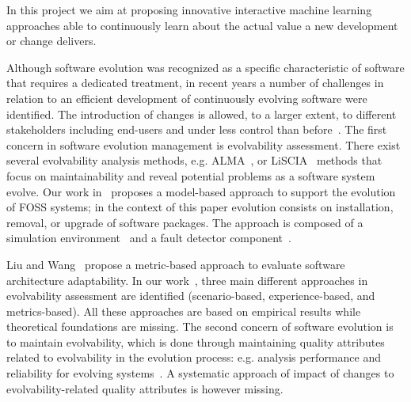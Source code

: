 \documentclass[12pt]{article}
\begin{document}
In this project we aim at proposing innovative interactive machine learning~\cite{interactiveMachineLearning} approaches able to %
continuously learn about the actual value a new development or change delivers. %


 Although software evolution was recognized as a specific characteristic of software that requires a dedicated treatment, in recent years a number of challenges in relation to an efficient development of continuously evolving software were identified. The introduction of changes is allowed, to a larger extent, to different stakeholders including end-users and under less control than before~\cite{Mens2005,Baresi06}. The first concern in software evolution management is evolvability assessment. There exist several evolvability analysis methods, e.g. ALMA~\cite{Bengtsson2004}, or LiSCIA~\cite{BD10} methods that focus on maintainability and reveal potential problems as a software system evolve. Our work in~\cite{DiCosmo2011} proposes a model-based approach to support the evolution of FOSS systems; in the context of this paper evolution consists on installation, removal, or upgrade of software packages. The approach is composed of a simulation environment~\cite{DiRuscio2014} and a fault detector component~\cite{DiRuscio2015}.

Liu and Wang~\cite{LW05} propose a metric-based approach to evaluate software architecture adaptability. In our work~\cite{PCM12}, three main different approaches in evolvability assessment are identified (scenario-based, experience-based, and metrics-based). All these approaches are based on empirical results while theoretical foundations are missing. The second concern of software evolution is to maintain evolvability, which is done through maintaining quality attributes related to evolvability in the evolution process:  e.g. analysis performance and reliability for evolving systems~\cite{Koziolek2012}. A systematic approach of impact of changes to evolvability-related quality attributes is however missing. 
\end{document}

